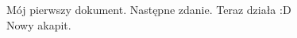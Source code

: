 \documentclass[11pt]{article}
\begin{document}
Mój pierwszy dokument.  Następne zdanie. Teraz działa :D
\\Nowy akapit.
\end{document}
